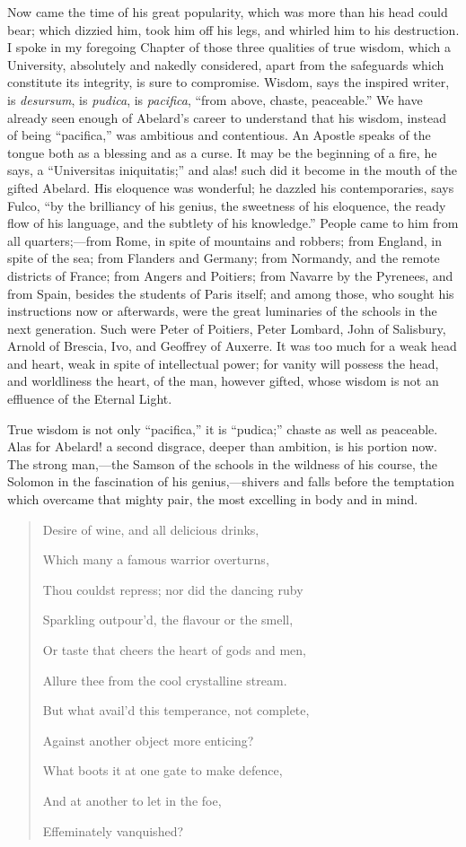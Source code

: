 Now came the time of his great
popularity, which was more than his head could bear; which dizzied
him, took him off his legs, and whirled him to his destruction. I
spoke in my foregoing Chapter of those three qualities of true wisdom,
which a University, absolutely and nakedly considered, apart from the
safeguards which constitute its integrity, is sure to compromise.
Wisdom, says the inspired writer, is \emph{desursum}, is \emph{pudica},
is \emph{pacifica}, ``from above, chaste, peaceable.'' We have
already seen enough of Abelard's career to understand that his wisdom,
instead of being ``pacifica,'' was ambitious and contentious. An
Apostle speaks of the tongue both as a blessing and as a curse. It may
be the beginning of a fire, he says, a ``Universitas iniquitatis;''
and alas! such did it become in the mouth of the gifted Abelard. His
eloquence was wonderful; he dazzled his contemporaries, says Fulco, ``by the brilliancy of his genius, the sweetness of his eloquence,
the ready flow of his language, and the subtlety of his knowledge.''
People came to him from all quarters;—from Rome, in spite of
mountains and robbers; from England, in spite of the sea; from
Flanders and Germany; from Normandy, and the remote districts of
France; from Angers and Poitiers; from Navarre by the Pyrenees,
and from Spain, besides the students of Paris itself; and among those,
who sought his instructions now or afterwards, were the great
luminaries of the schools in the next generation. Such were Peter of
Poitiers, Peter Lombard, John of Salisbury, Arnold of Brescia, Ivo,
and Geoffrey of Auxerre. It was too much for a weak head and heart,
weak in spite of intellectual power; for vanity will possess the head,
and worldliness the heart, of the man, however gifted, whose wisdom is
not an effluence of the Eternal Light.

True wisdom is not only ``pacifica,''
it is ``pudica;'' chaste as well as peaceable. Alas for Abelard! a
second disgrace, deeper than ambition, is his portion now. The strong
man,—the Samson of the schools in the wildness of his course, the
Solomon in the fascination of his genius,—shivers and falls before
the temptation which overcame that mighty pair, the most excelling in
body and in mind.

\begin{quote}

Desire of wine, and all
delicious drinks,

Which many a famous warrior overturns,

Thou couldst repress; nor did the dancing ruby

Sparkling outpour'd, the flavour or the smell,

Or taste that cheers the heart of gods and men,

Allure thee from the cool crystalline stream.

But what avail'd this temperance, not complete,

Against another object more enticing?

What boots it at one gate to make defence,

And at another to let in the foe,

Effeminately vanquished?

\end{quote}

